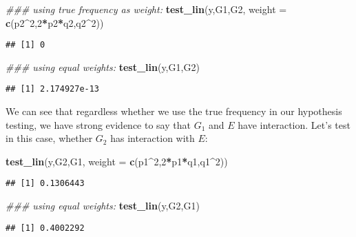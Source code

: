 \documentclass[]{article}
\newenvironment{Shaded}{\begin{snugshade}}{\end{snugshade}}
\newcommand{\CommentTok}[1]{\textcolor[rgb]{0.56,0.35,0.01}{\textit{#1}}}
\newcommand{\DataTypeTok}[1]{\textcolor[rgb]{0.13,0.29,0.53}{#1}}
\newcommand{\DecValTok}[1]{\textcolor[rgb]{0.00,0.00,0.81}{#1}}
\newcommand{\KeywordTok}[1]{\textcolor[rgb]{0.13,0.29,0.53}{\textbf{#1}}}
\newcommand{\NormalTok}[1]{#1}
\newcommand{\OperatorTok}[1]{\textcolor[rgb]{0.81,0.36,0.00}{\textbf{#1}}}
\begin{document}
\begin{Shaded}
\begin{Highlighting}[]
\CommentTok{### using true frequency as weight:}
\KeywordTok{test_lin}\NormalTok{(y,G1,G2, }\DataTypeTok{weight =} \KeywordTok{c}\NormalTok{(p2}\OperatorTok{^}\DecValTok{2}\NormalTok{,}\DecValTok{2}\OperatorTok{*}\NormalTok{p2}\OperatorTok{*}\NormalTok{q2,q2}\OperatorTok{^}\DecValTok{2}\NormalTok{))}
\end{Highlighting}
\end{Shaded}

\begin{verbatim}
## [1] 0
\end{verbatim}

\begin{Shaded}
\begin{Highlighting}[]
\CommentTok{### using equal weights:}
\KeywordTok{test_lin}\NormalTok{(y,G1,G2)}
\end{Highlighting}
\end{Shaded}

\begin{verbatim}
## [1] 2.174927e-13
\end{verbatim}

We can see that regardless whether we use the true frequency in our
hypothesis testing, we have strong evidence to say that \(G_1\) and
\(E\) have interaction. Let's test in this case, whether \(G_2\) has
interaction with \(E\):

\begin{Shaded}
\begin{Highlighting}[]
\KeywordTok{test_lin}\NormalTok{(y,G2,G1, }\DataTypeTok{weight =} \KeywordTok{c}\NormalTok{(p1}\OperatorTok{^}\DecValTok{2}\NormalTok{,}\DecValTok{2}\OperatorTok{*}\NormalTok{p1}\OperatorTok{*}\NormalTok{q1,q1}\OperatorTok{^}\DecValTok{2}\NormalTok{))}
\end{Highlighting}
\end{Shaded}

\begin{verbatim}
## [1] 0.1306443
\end{verbatim}

\begin{Shaded}
\begin{Highlighting}[]
\CommentTok{### using equal weights:}
\KeywordTok{test_lin}\NormalTok{(y,G2,G1)}
\end{Highlighting}
\end{Shaded}

\begin{verbatim}
## [1] 0.4002292
\end{verbatim}
\end{document}
